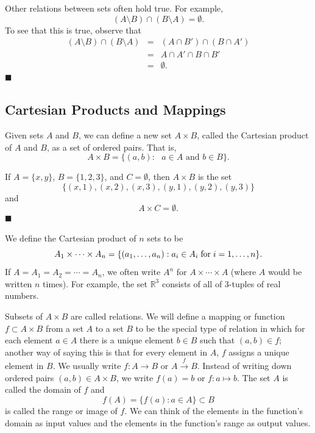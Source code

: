 \medskip
 
Other relations between sets often hold true.  For example,
$$
( A \setminus B) \cap (B \setminus A) = \emptyset.
$$
To see that this is true, observe that
\begin{eqnarray*}
( A \setminus B) \cap (B \setminus A)
& = &
( A \cap B') \cap (B \cap A') \\
& = &
A \cap A' \cap B \cap B' \\
& = & \emptyset.
\end{eqnarray*}
\hspace{\fill} $\blacksquare$
 
 
\subsection*{Cartesian Products and Mappings}

Given sets $A$ and $B$, we can define a new set $A \times\label{cartesian} B$, called the {\bfi Cartesian product\/}  of $A$ and $B$, as a set of ordered pairs.  That is, 
$$
A \times B = \{ (a,b) : \mbox{ $a \in A$ and $b \in B$} \}.
$$
 
\medskip
 
If $A = \{ x, y \}$, $B = \{ 1, 2, 3 \}$, and $C = \emptyset$, then $A \times B$ is the set 
$$
\{ (x, 1), (x, 2), (x, 3), (y, 1), (y, 2), (y, 3) \}
$$
and
$$
A \times C = \emptyset.
$$
\hspace{\fill} $\blacksquare$
 
\medskip

We define the {\bfi Cartesian product of $n$ sets\/} to be
$$
A_1 \times \cdots \times A_n = \{ (a_1, \ldots, a_n): a_i \in A_i {\rm\; for\;} i = 1, \ldots, n \}.
$$
If $A = A_1 = A_2 = \cdots = A_n$, we often write $A^n$ for $A \times \cdots \times A$ (where $A$ would be written $n$ times)\label{ncartesian}.   For example, the set ${\mathbb R}^3$ consists of all of 3-tuples of real numbers.
 
Subsets of $A \times B$ are called {\bfi relations}.  We will define a  {\bfi mapping\/} or {\bfi function} $f \subset A \times B$ from a set $A$ to a set $B$ to be the special type of  relation in which for each element $a \in A$ there is a unique element $b \in B$ such that $(a, b) \in f$; another way of saying this is that for every element in $A$, $f$ assigns a unique element in $B$.  We usually write $f:A \rightarrow B$ or $A \stackrel{f}{\rightarrow} B$.  Instead of writing down ordered pairs  $(a,b) \in A \times B$, we write $f(a) = b$ or $f : a \mapsto b$.  The set  $A$ is called the {\bfi domain\/} of $f$ and   
$$
f(A) = \{ f(a) : a \in A \} \subset B
$$
is called the {\bfi range\/} or {\bfi image\/} of $f$.  We can think of the elements in the function's domain as input values and the elements in the function's range as output values.  
 
